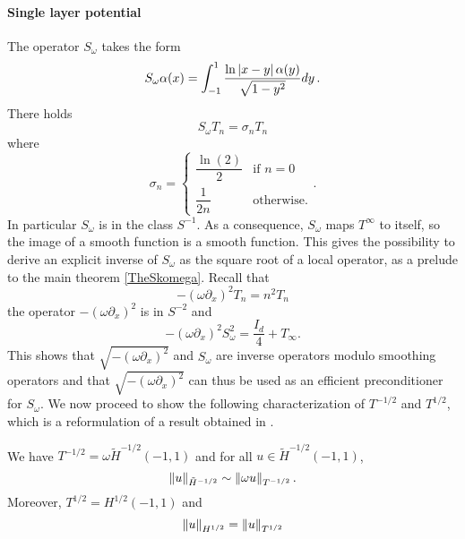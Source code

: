 \documentclass[a4paper]{article}
\begin{document}
\paragraph{Single layer potential} The operator $S_\omega$ takes the form 
\[S_\omega \alpha(x) = \int_{-1}^{1} \frac{\ln \left\lvert x - y \right\rvert \alpha(y)}{\sqrt{1 - y^2}}dy \,.\]
There holds 
\begin{equation}
	\label{explicitEigs}
	S_\omega T_n = \sigma_n T_n
\end{equation}
where 
\[\sigma_n = \begin{cases}
\dfrac{\ln(2)}{2} & \text{if } n=0\\
\dfrac{1}{2n} & \text{otherwise}.
\end{cases}.\]
In particular $S_\omega$ is in the class $S^{-1}$. As a consequence, $S_\omega$ maps $T^{\infty}$ to itself, so the image of a smooth function is a smooth function. This gives the possibility to derive an explicit inverse of $S_\omega$ as the square root of a local operator, as a prelude to the main theorem \autoref{TheSkomega}. Recall that
\[-(\omega \partial_x)^2 T_n = n^2 T_n\]
the operator $-(\omega \partial_x)^2$ is in $S^{-2}$ and 
\begin{equation}
\label{prelude1}
	-(\omega \partial_x)^2 S_\omega^2 = \frac{I_d}{4} + T_\infty.
\end{equation}
This shows that $\sqrt{-(\omega \partial_x)^2}$ and $S_\omega$ are inverse operators modulo smoothing operators and that $\sqrt{-(\omega \partial_x)^2}$ can thus be used as an efficient preconditioner for $S_\omega$.  
We now proceed to show the following characterization of $T^{-1/2}$ and $T^{1/2}$, which is a reformulation of a result obtained in \cite{jerez2012explicit} .
\begin{Lem}
	\label{LemmaT-1/2}
	We have $T^{-1/2} = \omega\tilde{H}^{-1/2}(-1,1)$ and for all $u \in \tilde{H}^{-1/2}(-1,1)$,
	\[\left\|u\right\|_{\tilde{H}^{-1/2}} \sim \left\|\omega u\right\|_{T^{-1/2}}.\] 
	Moreover, $T^{1/2} = H^{1/2}(-1,1)$ and 
	\[\left\|u\right\|_{H^{1/2}} = \left\|u\right\|_{T^{1/2}}\]
\end{Lem}
\end{document}

